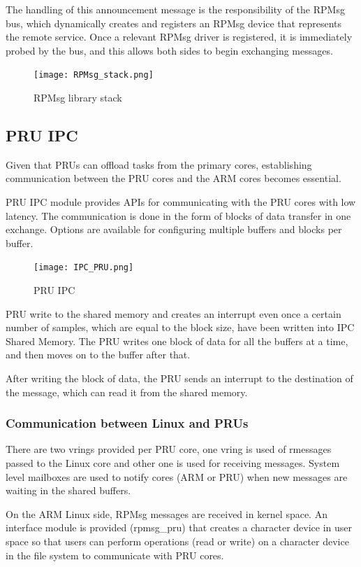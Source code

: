 The handling of this announcement message is the responsibility of the
RPMsg bus, which dynamically creates and registers an RPMsg device that
represents the remote service. Once a relevant RPMsg driver is registered, it
is immediately probed by the bus, and this allows both sides to begin
exchanging messages.

\begin{figure}[H]
    \centering
    \texttt{[image: RPMsg\_stack.png]}
    \caption{RPMsg library stack}
\end{figure}

\subsection{PRU IPC}

Given that PRUs can offload tasks from the primary cores, establishing 
communication between the PRU cores and the ARM cores becomes essential.

PRU IPC module provides APIs for communicating with the PRU cores with low
latency. The communication is done in the form of blocks of data transfer in
one exchange. Options are available for configuring multiple buffers and blocks
per buffer.

\begin{figure}[H]
    \centering
    \texttt{[image: IPC\_PRU.png]}
    \caption{PRU IPC}
\end{figure}

PRU write to the shared memory and creates an interrupt even once a certain
number of samples, which are equal to the block size, have been written into
IPC Shared Memory.
The PRU writes one block of data for all the buffers at a time, and then moves
on to the buffer after that.

After writing the block of data, the PRU sends an interrupt to the destination
of the message, which can read it from the shared memory.

\subsubsection{Communication between Linux and PRUs}

There are two vrings provided per PRU core, one vring is used of rmessages
passed to the Linux core and other one is used for receiving messages.
System level mailboxes are used to notify cores (ARM or PRU) when new messages
are waiting in the shared buffers.

On the ARM Linux side, RPMsg messages are received in kernel space.
An interface module is provided (rpmsg\_pru) that creates a character device in
user space so that users can perform operations (read or write) on a character
device in the file system to communicate with PRU cores.

